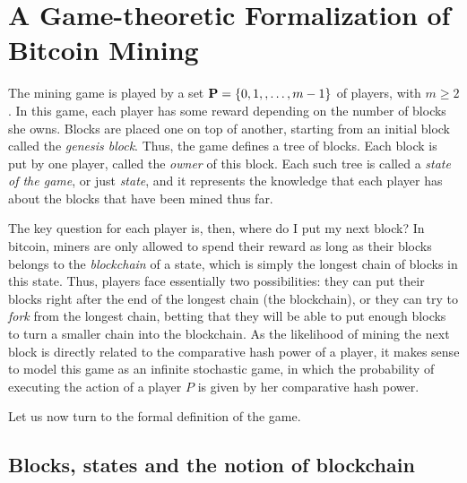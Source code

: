 
\section{A Game-theoretic Formalization of Bitcoin Mining}
\label{sec-formalization}

The mining game is played by a set $\mathbf{P} = \{0, 1, , \ldots, m-1\}$ of players, with $m \geq 2$.
In this game, each player has some reward depending on the number of blocks she owns. Blocks are placed one on top of another, starting from an initial block called the {\em genesis block}. Thus, the game defines a tree of blocks. Each block is put by one player, called the {\em owner} of this block. Each such tree is called a {\em state of the game}, or just {\em state}, and it represents the knowledge that each player has about the blocks that have been mined thus far. 

The key question for each player is, then, where do I put my next block? In bitcoin, miners are only allowed to spend their reward as long 
as their blocks belongs to the \emph{blockchain} of a state, which is simply the longest chain of blocks in this state. Thus, players face essentially two possibilities: they can put their blocks right after the end of the longest chain (the blockchain), or they can try to \emph{fork} 
from the longest chain, betting that they will be able to put enough blocks to turn a smaller chain into the blockchain. As the likelihood of 
mining the next block is directly related to the comparative hash power of a player, it makes sense to model this game as an infinite 
stochastic game, in which the probability of executing the action of a player $P$ is given by her comparative hash power. 

Let us now turn to the formal definition of the game. 


\subsection{Blocks, states and the notion of blockchain}

